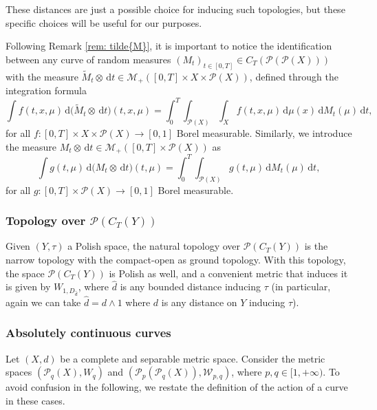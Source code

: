 \documentclass[10pt,leqno]{amsart}
\numberwithin{equation}{section}
\newcommand{\PP}{\mathcal{P}}
\renewcommand{\d}{\mathrm{d}}
\begin{document}
These distances are just a possible choice for inducing such topologies, but these specific choices will be useful for our purposes.

Following Remark \ref{rem: tilde{M}}, it is important to notice the identification between any curve of random measures $(M_t)_{t\in[0,T]}\in C_T(\PP(\PP(X)))$ with the measure $\widetilde{M}_t\otimes \,\d t \in \mathcal{M}_+([0,T]\times X \times \PP(X))$, defined through the integration formula 
\begin{equation}\label{eq: tilde M otimes dt}
    \int f(t,x,\mu) \,\d\big(\widetilde{M}_t\otimes \,\d t\big)(t,x,\mu) = \int_0^T \int_{\PP(X)}\int_X f(t,x,\mu) \,\d\mu(x) \,\d M_t(\mu)\,\d t,\end{equation}
for all $f:[0,T]\times X \times \PP(X) \to [0,1]$ Borel measurable. Similarly, we introduce the measure $M_t\otimes \,\d t \in \mathcal{M}_+([0,T]\times \PP(X))$ as 
\begin{equation}\label{eq: M otimes dt}
    \int g(t,\mu) \,\d\big(M_t\otimes \,\d t\big)(t,\mu) = \int_0^T \int_{\PP(X)}g(t,\mu)  \,\d M_t(\mu)\,\d t,
\end{equation}
for all $g:[0,T] \times \PP(X) \to [0,1]$ Borel measurable.

\subsubsection{Topology over $\PP(C_T(Y))$}\label{subsub top over P(C_T)}
Given $(Y,\tau)$ a Polish space, the natural topology over $\PP(C_T(Y))$ is the narrow topology with the compact-open as ground topology. With this topology, the space $\PP(C_T(Y))$ is Polish as well, and a convenient metric that induces it is given by 
$W_{1,D_{\hat{d}}}$,
where $\hat{d}$ is any bounded distance inducing $\tau$ (in particular, again we can take $\hat{d}= d\wedge 1$ where $d$ is any distance on $Y$ inducing $\tau$).


\subsubsection{Absolutely continuous curves}\label{subsub ac curve in prob space}
Let $(X,d)$ be a complete and separable metric space. Consider the metric spaces $(\PP_q(X),W_q)$ and $(\PP_p(\PP_q(X)),\mathcal{W}_{p,q})$, where $p,q\in [1,+\infty)$. To avoid confusion in the following, we restate the definition of the action of a curve in these cases.
\end{document}
